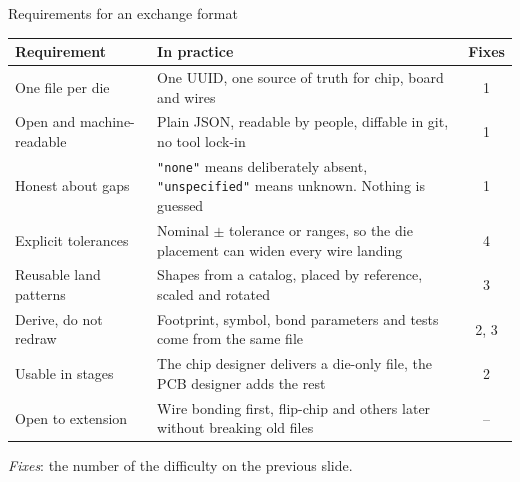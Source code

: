 \documentclass[aspectratio=169,11pt]{beamer}
\begin{document}
\begin{frame}{Requirements for an exchange format}
  \footnotesize
  \vspace{0.3em}
  \renewcommand{\arraystretch}{1.0}
  \begin{tabular}{@{}L{3.3cm}L{7.2cm}c@{}}
    \toprule
    \textbf{Requirement} & \textbf{In practice} & \textbf{Fixes}\\
    \midrule
    One file per die & One UUID, one source of truth for chip, board and wires & 1\\
    Open and machine-readable & Plain JSON, readable by people, diffable in git, no tool lock-in & 1\\
    Honest about gaps & \texttt{"none"} means deliberately absent, \texttt{"unspecified"} means unknown. Nothing is guessed & 1\\
    Explicit tolerances & Nominal $\pm$ tolerance or ranges, so the die placement can widen every wire landing & 4\\
    Reusable land patterns & Shapes from a catalog, placed by reference, scaled and rotated & 3\\
    Derive, do not redraw & Footprint, symbol, bond parameters and tests come from the same file & 2, 3\\
    Usable in stages & The chip designer delivers a die-only file, the PCB designer adds the rest & 2\\
    Open to extension & Wire bonding first, flip-chip and others later without breaking old files & --\\
    \bottomrule
  \end{tabular}
  \vspace{0.1em}

  {\scriptsize\color{cobgrey} \textit{Fixes}: the number of the difficulty on the previous slide.}
\end{frame}
\end{document}
